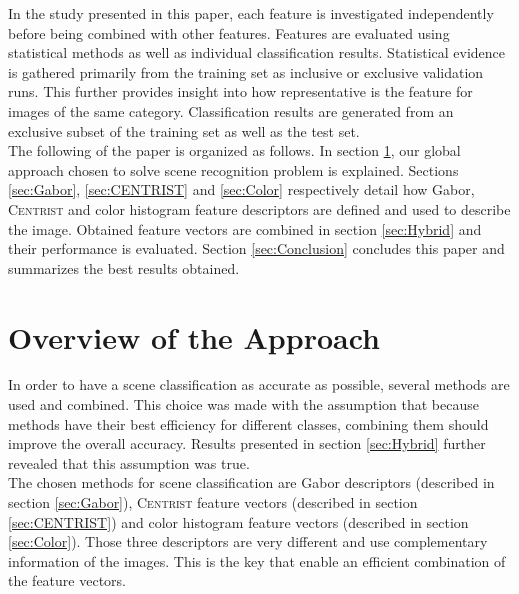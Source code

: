 \documentclass[%
	final,
	narroweqnarray,
	notitlepage,
	inline,
	twoside,
	]{ieee}
\begin{document}
In the study presented in this paper, each feature is investigated independently before being combined with other features. Features are evaluated using statistical methods as well as individual classification results. Statistical evidence is gathered primarily from the training set as inclusive or exclusive validation runs. This further provides insight into how representative is the feature for images of the same category. Classification results are generated from an exclusive subset of the training set as well as the test set.\\

The following of the paper is organized as follows. In section \ref{sec:approach}, our global approach chosen to solve scene recognition problem is explained. Sections \ref{sec:Gabor}, \ref{sec:CENTRIST} and \ref{sec:Color} respectively detail how Gabor, \textsc{Centrist} and color histogram feature descriptors are defined and used to describe the image. Obtained feature vectors are combined in section \ref{sec:Hybrid} and their performance is evaluated. Section \ref{sec:Conclusion} concludes this paper and summarizes the best results obtained. 
\section{Overview of the Approach}
\label{sec:approach}
In order to have a scene classification as accurate as possible, several methods are used and combined. This choice was made with the assumption that because methods have their best efficiency for different classes, combining them should improve the overall accuracy. Results presented in section \ref{sec:Hybrid} further revealed that this assumption was true. \\
The chosen methods for scene classification are Gabor descriptors (described in section \ref{sec:Gabor}), \textsc{Centrist} feature vectors (described in section \ref{sec:CENTRIST}) and color histogram feature vectors (described in section \ref{sec:Color}). Those three descriptors are very different and use complementary information of the images. This is the key that enable an efficient combination of the feature vectors. 


\end{document}
